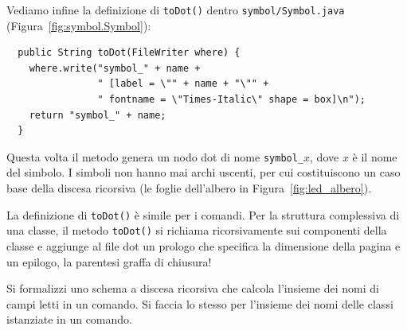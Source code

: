 Vediamo infine la definizione di \texttt{toDot()} dentro
\texttt{symbol/Symbol.java} (Figura~\ref{fig:symbol.Symbol}):
%
\begin{verbatim}
  public String toDot(FileWriter where) {
    where.write("symbol_" + name +
                " [label = \"" + name + "\"" +
                " fontname = \"Times-Italic\" shape = box]\n");
    return "symbol_" + name;
  }
\end{verbatim}
%
Questa volta il metodo genera un nodo dot di nome \texttt{symbol\_}$x$,
dove $x$ \`e il nome del simbolo. I simboli non hanno mai archi uscenti, per
cui costituiscono un caso base della discesa ricorsiva (le foglie
dell'albero in Figura~\ref{fig:led_albero}).

La definizione di \texttt{toDot()} \`e simile per i comandi. Per la
struttura complessiva di una classe, il metodo \texttt{toDot()}
si richiama ricorsivamente sui componenti della classe e aggiunge al file
dot un prologo che specifica la dimensione della pagina e un epilogo, \cioe
la parentesi graffa di chiusura!
%
%
\begin{exercise}\label{ex:descent_fields}
Si formalizzi uno schema a discesa ricorsiva che calcola l'insieme dei
nomi di campi letti in un comando. Si faccia lo stesso per l'insieme
dei nomi delle classi istanziate in un comando.
\end{exercise}
%
